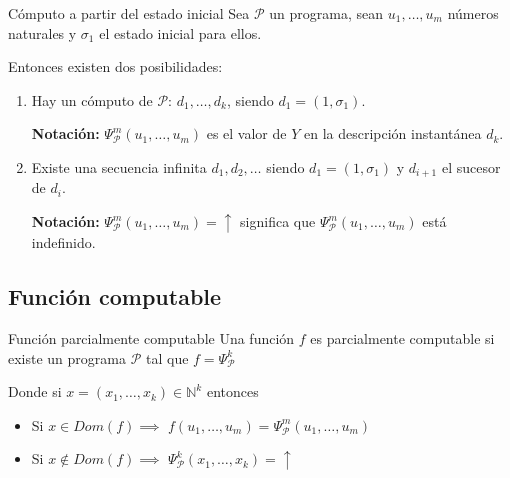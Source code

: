\medskip

\begin{definicion}{Cómputo a partir del estado inicial}{}
    Sea $\mathcal{P}$ un programa, sean $u_1, \dotsc, u_m$ números naturales
    y $\sigma_1$ el estado inicial para ellos.

    \medskip

    Entonces existen dos posibilidades:
    \begin{enumerate}
        \item Hay un cómputo de $\mathcal{P}$: $d_1, \dotsc, d_k$, siendo
            $d_1 = (1, \sigma_1)$.

            \bigskip
            \textbf{Notación:}
            $\Psi_{\mathcal{P}}^{m} (u_1, \dotsc, u_m)$ es el valor de $Y$
            en la descripción instantánea $d_k$.

        \item Existe una secuencia infinita $d_1, d_2, \dotsc$ siendo
            $d_1 = (1, \sigma_1)$ y $d_{i+1}$ el sucesor de $d_i$.

            \bigskip
            \textbf{Notación:}
            $\Psi_{\mathcal{P}}^{m} (u_1, \dotsc, u_m) = \uparrow$ significa
            que $\Psi_{\mathcal{P}}^{m} (u_1, \dotsc, u_m)$ está indefinido.
    \end{enumerate}
\end{definicion}

\subsection{Función computable}

\begin{definicion}{Función parcialmente computable}{}
    Una función $f$ es parcialmente computable si existe un programa 
    $\mathcal{P}$ tal que $f = \Psi_{\mathcal{P}}^k$

    \medskip

    Donde si $x = (x_1, \dotsc, x_k) \in \mathbb{N}^k$ entonces
    \begin{itemize}
        \item Si $x \in Dom(f) \implies$
            $f(u_1, \dotsc, u_m) = \Psi_{\mathcal{P}}^m (u_1, \dotsc, u_m)$
    \item Si $x \notin Dom(f) \implies$
            $\Psi_{\mathcal{P}}^k (x_1, \dotsc, x_k) = \uparrow$
    \end{itemize}
\end{definicion}

